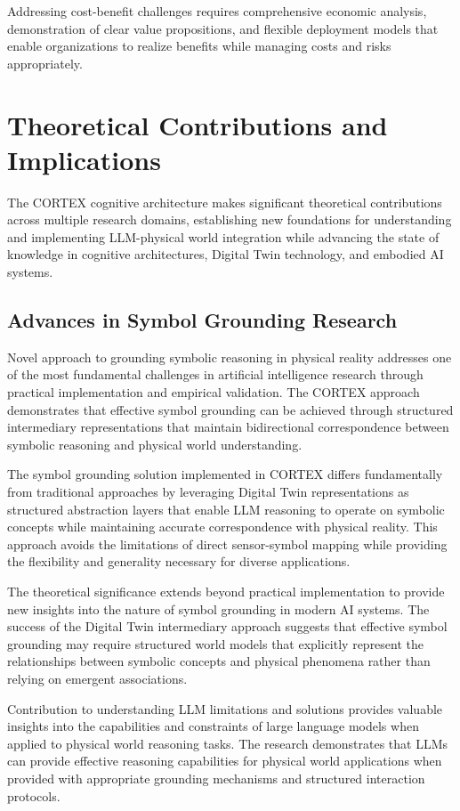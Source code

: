 Addressing cost-benefit challenges requires comprehensive economic analysis, demonstration of clear value propositions, and flexible deployment models that enable organizations to realize benefits while managing costs and risks appropriately.

\section{Theoretical Contributions and Implications}

The CORTEX cognitive architecture makes significant theoretical contributions across multiple research domains, establishing new foundations for understanding and implementing LLM-physical world integration while advancing the state of knowledge in cognitive architectures, Digital Twin technology, and embodied AI systems.

\subsection{Advances in Symbol Grounding Research}

Novel approach to grounding symbolic reasoning in physical reality addresses one of the most fundamental challenges in artificial intelligence research through practical implementation and empirical validation. The CORTEX approach demonstrates that effective symbol grounding can be achieved through structured intermediary representations that maintain bidirectional correspondence between symbolic reasoning and physical world understanding.

The symbol grounding solution implemented in CORTEX differs fundamentally from traditional approaches by leveraging Digital Twin representations as structured abstraction layers that enable LLM reasoning to operate on symbolic concepts while maintaining accurate correspondence with physical reality. This approach avoids the limitations of direct sensor-symbol mapping while providing the flexibility and generality necessary for diverse applications.

The theoretical significance extends beyond practical implementation to provide new insights into the nature of symbol grounding in modern AI systems. The success of the Digital Twin intermediary approach suggests that effective symbol grounding may require structured world models that explicitly represent the relationships between symbolic concepts and physical phenomena rather than relying on emergent associations.

Contribution to understanding LLM limitations and solutions provides valuable insights into the capabilities and constraints of large language models when applied to physical world reasoning tasks. The research demonstrates that LLMs can provide effective reasoning capabilities for physical world applications when provided with appropriate grounding mechanisms and structured interaction protocols.

